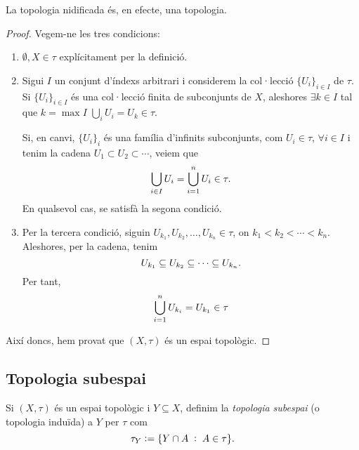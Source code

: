 \documentclass[../main.tex]{subfiles}
\begin{document}
\begin{prop}
\label{prop:topologianidificada} La topologia nidificada és, en efecte, una topologia.
\end{prop}
\begin{proof}
Vegem-ne les tres condicions:
\begin{enumerate}[(1)]
    \item $\emptyset,X\in\tau$ explícitament per la definició.
    \item Sigui $I$ un conjunt d'índexs arbitrari i considerem la col·lecció $\{U_i\}_{i\in I}$ de $\tau$. Si $\{U_i\}_{i\in I}$ és una col·lecció finita de subconjunts de $X$, aleshores $\exists k\in I$ tal que $k = \max I$ $\bigcup_i U_i =U_k\in\tau$.
    
    Si, en canvi, $\{U_i\}_i$ és una família d'infinits subconjunts, com $U_i\in\tau$, $\forall i\in I$ i tenim la cadena $U_1\subset U_2\subset\cdots$, veiem que
    \begin{equation}
        \notag
        \bigcup_{i\in I}U_i = \bigcup_{i=1}^n U_i\in\tau. 
    \end{equation}
    En qualsevol cas, se satisfà la segona condició.
    \item Per la tercera condició, siguin $U_{k_1}, U_{k_2},\ldots,U_{k_n}\in\tau$, on $k_1<k_2<\cdots<k_n$. Aleshores, per la cadena, tenim 
    \begin{equation}
        \notag
        U_{k_1}\subseteq U_{k_2}\subseteq \cdots \subseteq U_{k_n}.
    \end{equation}
    Per tant, 
    \begin{equation}
        \notag
        \bigcup_{i=1}^n U_{k_i} = U_{k_1}\in\tau
    \end{equation}
\end{enumerate}
Així doncs, hem provat que $(X,\tau)$ és un espai topològic.
\end{proof}

\subsection{Topologia subespai}
\begin{defi}
\label{def:topologiasubespai} Si $(X,\tau)$ és un espai topològic i $Y\subseteq X$, definim la \textit{topologia subespai} (o topologia induïda) a $Y$ per $\tau$ com
\begin{equation}
    \notag
    \tau_Y:=\{Y\cap A\;:\;A\in \tau\}.
\end{equation}
\end{defi}
\end{document}
